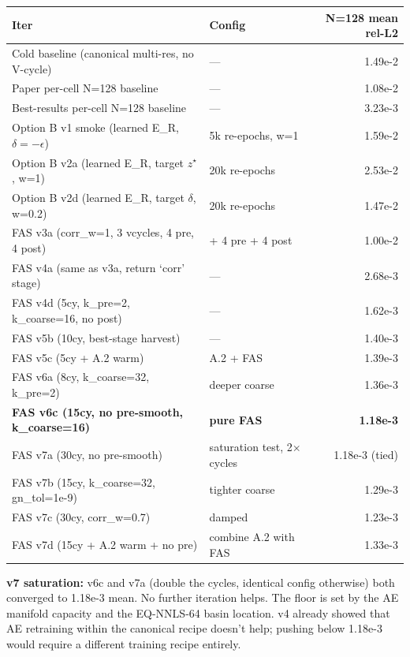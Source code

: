\begin{center}
\begin{tabular}{l l r}
  \textbf{Iter} & \textbf{Config} & \textbf{N=128 mean rel-L2} \\
  \hline
  Cold baseline (canonical multi-res, no V-cycle) & --- & 1.49e-2 \\
  Paper per-cell N=128 baseline & --- & 1.08e-2 \\
  Best-results per-cell N=128 baseline & --- & 3.23e-3 \\
  \hline
  Option B v1 smoke (learned E\_R, $\delta = -\epsilon$) & 5k re-epochs, w=1 & 1.59e-2 \\
  Option B v2a (learned E\_R, target $z^\star$, w=1) & 20k re-epochs & 2.53e-2 \\
  Option B v2d (learned E\_R, target $\delta$, w=0.2) & 20k re-epochs & 1.47e-2 \\
  \hline
  FAS v3a (corr\_w=1, 3 vcycles, 4 pre, 4 post) & + 4 pre + 4 post & 1.00e-2 \\
  FAS v4a (same as v3a, return `corr' stage) & --- & 2.68e-3 \\
  FAS v4d (5cy, k\_pre=2, k\_coarse=16, no post) & --- & 1.62e-3 \\
  FAS v5b (10cy, best-stage harvest) & --- & 1.40e-3 \\
  FAS v5c (5cy + A.2 warm) & A.2 + FAS & 1.39e-3 \\
  FAS v6a (8cy, k\_coarse=32, k\_pre=2) & deeper coarse & 1.36e-3 \\
  \textbf{FAS v6c (15cy, no pre-smooth, k\_coarse=16)} & \textbf{pure FAS} & \textbf{1.18e-3} \\
  FAS v7a (30cy, no pre-smooth) & saturation test, 2$\times$ cycles & 1.18e-3 (tied) \\
  FAS v7b (15cy, k\_coarse=32, gn\_tol=1e-9) & tighter coarse & 1.29e-3 \\
  FAS v7c (30cy, corr\_w=0.7) & damped & 1.23e-3 \\
  FAS v7d (15cy + A.2 warm + no pre) & combine A.2 with FAS & 1.33e-3 \\
\end{tabular}
\end{center}

\textbf{v7 saturation:} v6c and v7a (double the cycles, identical config
otherwise) both converged to 1.18e-3 mean. No further iteration helps.
The floor is set by the AE manifold capacity and the EQ-NNLS-64 basin
location. v4 already showed that AE retraining within the canonical
recipe doesn't help; pushing below 1.18e-3 would require a different
training recipe entirely.

